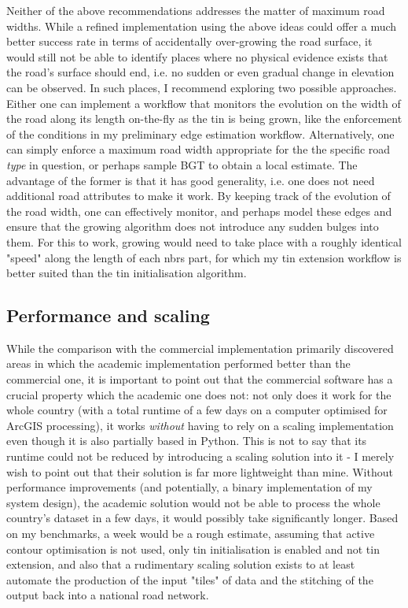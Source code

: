 Neither of the above recommendations addresses the matter of maximum road widths. While a refined implementation using the above ideas could offer a much better success rate in terms of accidentally over-growing the road surface, it would still not be able to identify places where no physical evidence exists that the road's surface should end, i.e. no sudden or even gradual change in elevation can be observed. In such places, I recommend exploring two possible approaches. Either one can implement a workflow that monitors the evolution on the width of the road along its length on-the-fly as the \ac{tin} is being grown, like the enforcement of the conditions in my preliminary edge estimation workflow. Alternatively, one can simply enforce a maximum road width appropriate for the the specific road \textit{type} in question, or perhaps sample BGT to obtain a local estimate. The advantage of the former is that it has good generality, i.e. one does not need additional road attributes to make it work. By keeping track of the evolution of the road width, one can effectively monitor, and perhaps model these edges and ensure that the growing algorithm does not introduce any sudden bulges into them. For this to work, growing would need to take place with a roughly identical "speed" along the length of each \ac{nbrs} part, for which my \ac{tin} extension workflow is better suited than the \ac{tin} initialisation algorithm.

\subsection{Performance and scaling}
\label{sub:improvementsperformance}

While the comparison with the commercial implementation primarily discovered areas in which the academic implementation performed better than the commercial one, it is important to point out that the commercial software has a crucial property which the academic one does not: not only does it work for the whole country (with a total runtime of a few days on a computer optimised for ArcGIS processing), it works \textit{without} having to rely on a scaling implementation even though it is also partially based in Python. This is not to say that its runtime could not be reduced by introducing a scaling solution into it - I merely wish to point out that their solution is far more lightweight than mine. Without performance improvements (and potentially, a binary implementation of my system design), the academic solution would not be able to process the whole country's dataset in a few days, it would possibly take significantly longer. Based on my benchmarks, a week would be a rough estimate, assuming that active contour optimisation is not used, only \ac{tin} initialisation is enabled and not \ac{tin} extension, and also that a rudimentary scaling solution exists to at least automate the production of the input "tiles" of data and the stitching of the output back into a national road network.

